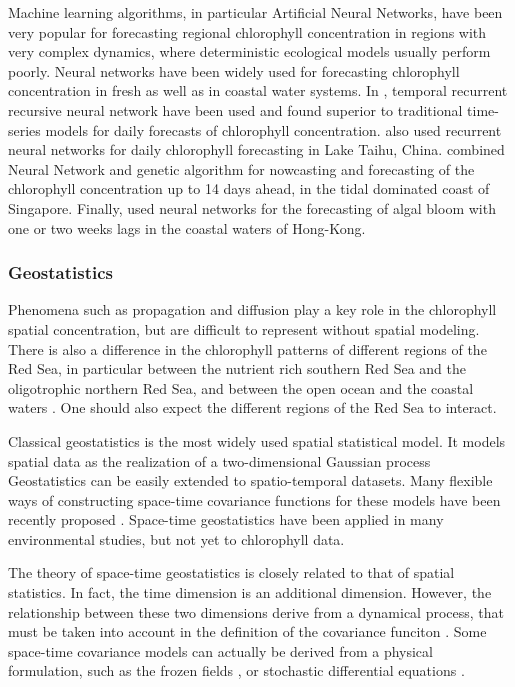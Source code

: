 Machine learning algorithms, in particular Artificial Neural Networks, have
been very popular for forecasting regional chlorophyll concentration in regions
with very complex dynamics, where deterministic ecological models usually
perform poorly.  Neural networks have been widely used for forecasting
chlorophyll concentration in fresh as well as in coastal water systems. In
\citet{Jeong2006}, temporal recurrent recursive neural network have been used
and found superior to traditional time-series models for daily forecasts of
chlorophyll concentration.  \citet{Wang2013} also used recurrent neural
networks for daily chlorophyll forecasting in Lake Taihu, China.
\citet{Mulia2013} combined Neural Network and genetic algorithm for nowcasting
and forecasting of the chlorophyll concentration up to 14 days ahead, in the
tidal dominated coast of Singapore.  Finally, \citet{Lee2013} used neural
networks for the forecasting of algal bloom with one or two weeks lags in the
coastal waters of Hong-Kong.

\subsubsection{Geostatistics}

Phenomena such as propagation and diffusion play a key role in the chlorophyll
spatial concentration, but are difficult to represent without spatial modeling.
There is also a difference in the chlorophyll patterns of different regions of
the Red Sea, in particular between the nutrient rich southern Red Sea and the
oligotrophic northern Red Sea, and between the open ocean and the coastal
waters \citep{Raitsos2013}.  One should also expect the different regions of
the Red Sea to interact.

Classical geostatistics is the most widely used spatial statistical model. It
models spatial data as the realization of a two-dimensional Gaussian process
Geostatistics can be easily extended to spatio-temporal datasets. Many flexible
ways of constructing space-time covariance functions for these models have been
recently proposed \citep{Gneiting2002, Cressie1999, Stein2005}. Space-time
geostatistics have been applied in many environmental studies, but not yet to
chlorophyll data.

The theory of space-time geostatistics is closely related to that of spatial
statistics. In fact, the time dimension is an additional dimension. However,
the relationship between these two dimensions derive from a dynamical process,
that must be taken into account in the definition of the covariance funciton
\citep{Gneiting2010}. Some space-time covariance models can actually be derived
from a physical formulation, such as the frozen fields \citep{Gneiting2010}, or
stochastic differential equations \citep{Brown2000, North2011}.


